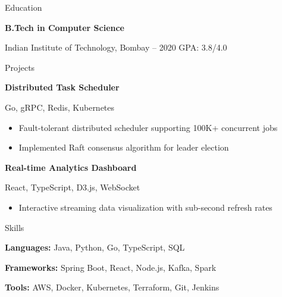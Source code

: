 \documentclass[11pt,a4paper]{article}
\begin{document}
{\fontsize{14pt}{17pt}\selectfont Education}\par
\vspace{8pt}

{\fontsize{11pt}{13pt}\selectfont\bfseries B.Tech in Computer Science}\par
{\fontsize{9pt}{11pt}\selectfont Indian Institute of Technology, Bombay  -- 2020 \quad GPA: 3.8/4.0}\par
\vspace{16pt}

{\fontsize{14pt}{17pt}\selectfont Projects}\par
\vspace{8pt}

{\fontsize{11pt}{13pt}\selectfont\bfseries Distributed Task Scheduler}\par
{\fontsize{9pt}{11pt}\selectfont Go, gRPC, Redis, Kubernetes }\par
\vspace{4pt}
\begin{itemize}[leftmargin=1.2em, itemsep=1pt, topsep=0pt, label={\textbullet}]
\item \small Fault-tolerant distributed scheduler supporting 100K+ concurrent jobs
\item \small Implemented Raft consensus algorithm for leader election
\end{itemize}
\vspace{10pt}

{\fontsize{11pt}{13pt}\selectfont\bfseries Real-time Analytics Dashboard}\par
{\fontsize{9pt}{11pt}\selectfont React, TypeScript, D3.js, WebSocket }\par
\vspace{4pt}
\begin{itemize}[leftmargin=1.2em, itemsep=1pt, topsep=0pt, label={\textbullet}]
\item \small Interactive streaming data visualization with sub-second refresh rates
\end{itemize}
\vspace{16pt}

{\fontsize{14pt}{17pt}\selectfont Skills}\par
\vspace{8pt}

{\fontsize{10pt}{12pt}\selectfont\bfseries Languages:} {\fontsize{10pt}{12pt}\selectfont Java, Python, Go, TypeScript, SQL}\par
\vspace{3pt}
{\fontsize{10pt}{12pt}\selectfont\bfseries Frameworks:} {\fontsize{10pt}{12pt}\selectfont Spring Boot, React, Node.js, Kafka, Spark}\par
\vspace{3pt}
{\fontsize{10pt}{12pt}\selectfont\bfseries Tools:} {\fontsize{10pt}{12pt}\selectfont AWS, Docker, Kubernetes, Terraform, Git, Jenkins}\par
\end{document}
